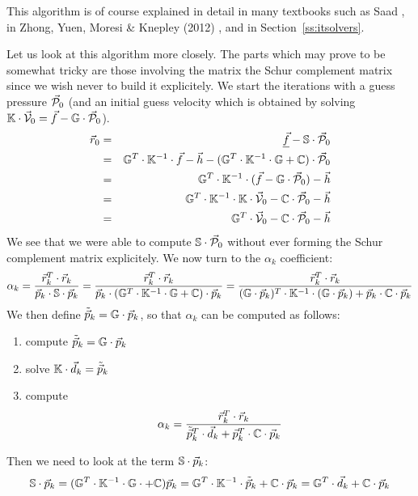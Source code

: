 This algorithm is of course explained in detail in many textbooks such as Saad \cite{saad},
in Zhong, Yuen, Moresi \& Knepley (2012) \cite{zhym12}, and in Section~\ref{ss:itsolvers}.

Let us look at this algorithm more closely. The parts which may prove to be somewhat tricky 
are those involving the matrix the Schur complement matrix since we wish never to build 
it explicitely. We start the iterations with a guess pressure $\vec{\cal P}_0$ (and an initial guess velocity 
which is obtained by solving ${\mathbb{K}}\cdot \vec{\cal V}_0 =\vec{f}- {\mathbb{G}}\cdot \vec{\cal P}_0$).
\begin{eqnarray}
\vec{r}_0 
&=& \underline{\vec{f}}-{\mathbb{S}} \cdot \vec{\cal P}_0 \nonumber\\
&=& {\mathbb{G}}^T\cdot {\mathbb{K}}^{-1}\cdot \vec{f} - \vec{h} - ({\mathbb{G}}^T\cdot {\mathbb{K}}^{-1}\cdot {\mathbb{G}} + {\mathbb{C}})\cdot \vec{\cal P}_0 \nonumber\\ 
&=& {\mathbb{G}}^T\cdot {\mathbb{K}}^{-1}\cdot (\vec{f} - {\mathbb{G}}\cdot \vec{\cal P}_0) - \vec{h} \nonumber\\
&=& {\mathbb{G}}^T\cdot {\mathbb{K}}^{-1}\cdot {\mathbb{K}}\cdot \vec{\cal V}_0 -{\mathbb{C}} \cdot \vec{\cal P}_0 - \vec{h} \nonumber\\ 
&=& {\mathbb{G}}^T\cdot \vec{\cal V}_0  -{\mathbb{C}} \cdot \vec{\cal P}_0   - \vec{h}  
\end{eqnarray}
We see that we were able to compute ${\mathbb{S}} \cdot \vec{\cal P}_0$ without ever forming the 
Schur complement matrix explicitely. We now turn to the $\alpha_k$ coefficient:
\[
\alpha_k 
= \frac{\vec{r}_k^T\cdot \vec{r}_k }{\vec{p}_k \cdot {\mathbb{S}}\cdot  \vec{p}_k } 
= \frac{\vec{r}_k^T \cdot \vec{r}_k }{\vec{p}_k\cdot ({\mathbb{G}}^T \cdot {\mathbb{K}}^{-1} \cdot {\mathbb{G}} +{\mathbb{C}} )\cdot \vec{p}_k } 
= \frac{\vec{r}_k^T \cdot \vec{r}_k }{({\mathbb{G}}\cdot \vec{p}_k)^T \cdot  {\mathbb{K}}^{-1} \cdot ({\mathbb{G}} \cdot \vec{p}_k) + \vec{p}_k\cdot {\mathbb{C}}\cdot \vec{p}_k } 
\]
We then define $\tilde{\vec{p}}_k = {\mathbb{G}} \cdot \vec{p}_k$, so that $\alpha_k$ can be computed as follows:
\begin{enumerate}
\item compute $\tilde{\vec{p}}_k = {\mathbb{G}} \cdot  \vec{p}_k$
\item solve ${\mathbb{K}}\cdot  \vec{d}_k = \tilde{\vec{p}}_k$
\item compute 
\[
\alpha_k=\frac{\vec{r}_k^T \cdot \vec{r}_k}{\tilde{\vec{p}}_k^T \cdot \vec{d}_k 
+ \vec{p}_k^T \cdot {\mathbb{C}}\cdot \vec{p}_k }
\]
\end{enumerate}
Then we need to look at the term ${\mathbb{S}}\cdot \vec{p}_k$:
\[
{\mathbb{S}}\cdot \vec{p}_k = ({\mathbb{G}}^T\cdot {\mathbb{K}}^{-1}\cdot {\mathbb{G}}\cdot +{\mathbb{C}} )\vec{p}_k 
= {\mathbb{G}}^T\cdot {\mathbb{K}}^{-1}\cdot \tilde{\vec{p}}_k  + {\mathbb{C}}\cdot \vec{p}_k= {\mathbb{G}}^T\cdot  \vec{d}_k + {\mathbb{C}} \cdot \vec{p}_k
\]
